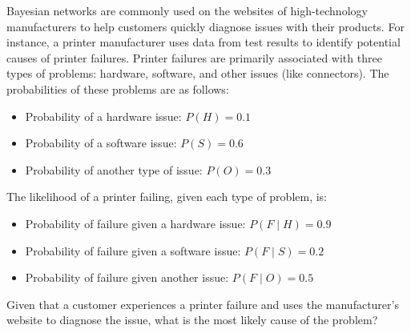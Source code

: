 \begin{example}
    Bayesian networks are commonly used on the websites of high-technology manufacturers to help customers quickly diagnose issues with their products. For instance, a printer manufacturer uses data from test results to identify potential causes of printer failures. Printer failures are primarily associated with three types of problems: hardware, software, and other issues (like connectors). The probabilities of these problems are as follows:
\begin{itemize}
    \item Probability of a hardware issue: $P(H)=0.1$
    \item Probability of a software issue: $P(S)=0.6$
    \item Probability of another type of issue: $P(O)=0.3$
\end{itemize}

The likelihood of a printer failing, given each type of problem, is:
\begin{itemize}
    \item Probability of failure given a hardware issue: $P(F \mid H)=0.9$
    \item Probability of failure given a software issue: $P(F \mid S)=0.2$
    \item Probability of failure given another issue: $P(F \mid O)=0.5$
\end{itemize}

Given that a customer experiences a printer failure and uses the manufacturer's website to diagnose the issue, what is the most likely cause of the problem?
\end{example}

